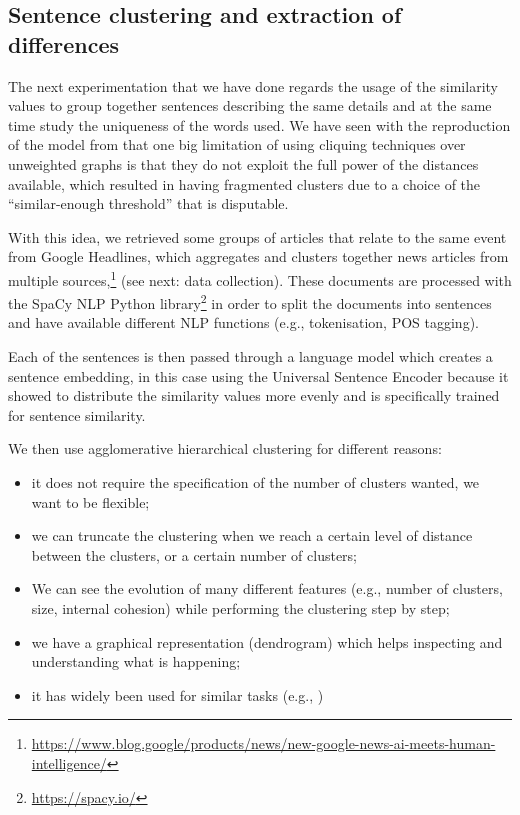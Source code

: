 \subsection{Sentence clustering and extraction of differences}
The next experimentation that we have done regards the usage of the similarity values to group together sentences describing the same details and at the same time study the uniqueness of the words used.
We have seen with the reproduction of the model from \citet{bountouridis2018explaining} that one big limitation of using cliquing techniques over unweighted graphs is that they do not exploit the full power of the distances available, which resulted in having fragmented clusters due to a choice of the ``similar-enough threshold'' that is disputable.

With this idea, we retrieved some groups of articles that relate to the same event from Google Headlines, which aggregates and clusters together news articles from multiple sources,\footnote{\url{https://www.blog.google/products/news/new-google-news-ai-meets-human-intelligence/}} (see next: data collection).
These documents are processed with the SpaCy NLP Python library\footnote{\url{https://spacy.io/}} in order to split the documents into sentences and have available different NLP functions (e.g., tokenisation, POS tagging).

Each of the sentences is then passed through a language model which creates a sentence embedding, in this case using the Universal Sentence Encoder because it showed to distribute the similarity values more evenly and is specifically trained for sentence similarity.

We then use agglomerative hierarchical clustering for different reasons:
\begin{itemize}
    \item it does not require the specification of the number of clusters wanted, we want to be flexible;
    \item we can truncate the clustering when we reach a certain level of distance between the clusters, or a certain number of clusters;
    \item We can see the evolution of many different features (e.g., number of clusters, size, internal cohesion) while performing the clustering step by step;
    \item we have a graphical representation (dendrogram) which helps inspecting and understanding what is happening;
    \item it has widely been used for similar tasks (e.g., \cite{TODO:meedan_talk_similarity:http://ceur-ws.org/Vol-2607/short4.pdf:or_better})
\end{itemize}

